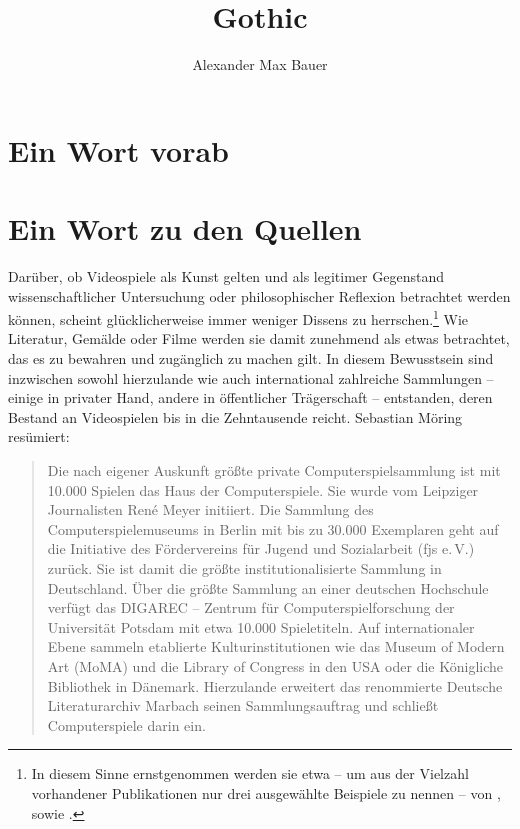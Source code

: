 \documentclass[a5paper,pagesize]{scrbook}
\title{Gothic}
\subtitle{}
\author{Alexander Max Bauer}
\date{}
\begin{document}
\maketitle


\frontmatter
\tableofcontents


\chapter{Ein Wort vorab}\label{ch:vorwort}


\chapter{Ein Wort zu den Quellen}\label{ch:quellen}
Darüber, ob Videospiele als Kunst gelten und als legitimer Gegenstand wissenschaftlicher Untersuchung oder philosophischer Reflexion betrachtet werden können, scheint glücklicherweise immer weniger Dissens zu herrschen.\footnote{In diesem Sinne ernstgenommen werden sie etwa -- um aus der Vielzahl vorhandener Publikationen nur drei ausgewählte Beispiele zu nennen -- von \autocite{feige_computerspiele_2015}, \autocite{zimmermann_gameskultur_2020} sowie \autocite{beil_game_2018}.}
Wie Literatur, Gemälde oder Filme werden sie damit zunehmend als etwas betrachtet, das es zu bewahren und zugänglich zu machen gilt.
In diesem Bewusstsein sind inzwischen sowohl hierzulande wie auch international zahlreiche Sammlungen -- einige in privater Hand, andere in öffentlicher Trägerschaft -- entstanden, deren Bestand an Videospielen bis in die Zehntausende reicht. Sebastian Möring resümiert:

\begin{quote}
Die nach eigener Auskunft größte private Computerspielsammlung ist mit 10.000 Spielen das
Haus der Computerspiele.
Sie wurde vom Leipziger Journalisten René Meyer initiiert.
Die Sammlung des Computerspielemuseums in Berlin mit bis zu 30.000 Exemplaren geht auf die Initiative des Fördervereins für Jugend und Sozialarbeit (fjs e.\,V.) zurück.
Sie ist damit die größte institutionalisierte Sammlung in Deutschland.
Über die größte Sammlung an einer deutschen Hochschule verfügt das DIGAREC -- Zentrum für Computerspielforschung der Universität Potsdam mit etwa 10.000 Spieletiteln.
Auf internationaler Ebene sammeln etablierte Kulturinstitutionen wie das Museum of Modern Art (MoMA) und die Library of Congress in den USA oder die Königliche Bibliothek in Dänemark.
Hierzulande erweitert das renommierte Deutsche Literaturarchiv Marbach seinen Sammlungsauftrag und schließt Computerspiele darin ein.\autocite[S.~120]{moering_kulturarchive_2020}
\end{quote}
\end{document}
